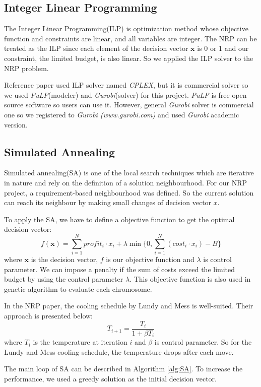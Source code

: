 \subsection{Integer Linear Programming}
The Integer Linear Programming(ILP) is optimization method whose objective function and constraints are linear, and all variables are integer. The NRP can be treated as the ILP since each element of the decision vector $\textbf{x}$ is 0 or 1 and our constraint, the limited budget, is also linear. So we applied the ILP solver to the NRP problem.

Reference paper\cite{ILP} used ILP solver named \textit{CPLEX}, but it is commercial solver so we used \textit{PuLP}(modeler) and \textit{Gurobi}(solver) for this project. \textit{PuLP} is free open source software so users can use it. However, general \textit{Gurobi} solver is commercial one so we registered to \textit{Gurobi (www.gurobi.com)} and used \textit{Gurobi} academic version.

\subsection{Simulated Annealing}
Simulated annealing(SA) is one of the local search techniques which are iterative in nature and rely on the definition of a solution neighbourhood. For our NRP project, a requirement-based neighbourhood was defined. So the current solution can reach its neighbour by making small changes of decision vector $x$.

To apply the SA, we have to define a objective function to get the optimal decision vector:
\[
f(\textbf{x}) = \sum_{i = 1}^{N} profit_i \cdot x_i + \lambda \min \Big\{0, \sum_{i = 1}^{N} (cost_i \cdot x_i) - B \Big\}
\]
where $\textbf{x}$ is the decision vector, $f$ is our objective function and $\lambda$ is control parameter. We can impose a penalty if the sum of costs exceed the limited budget by using the control parameter $\lambda$. This objective function is also used in genetic algorithm to evaluate each chromosome.

In the NRP paper\cite{NRP}, the cooling schedule by Lundy and Mess\cite{LundySA} is well-suited. Their approach is presented below:
\[
    T_{i+1} = \frac{T_i}{1 + \beta T_i}
\]
where $T_i$ is the temperature at iteration $i$ and $\beta$ is control parameter. So for the Lundy and Mess cooling schedule, the temperature drops after each move.

The main loop of SA can be described in Algorithm \ref{alg:SA}. To increase the performance, we used a greedy solution as the initial decision vector. 

